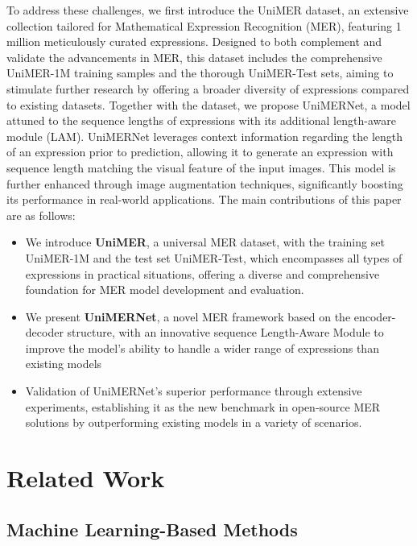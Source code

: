 \documentclass[runningheads]{llncs}
\begin{document}
To address these challenges, we first introduce the UniMER dataset, an extensive collection tailored for Mathematical Expression Recognition (MER), featuring 1 million meticulously curated expressions. Designed to both complement and validate the advancements in MER, this dataset includes the comprehensive UniMER-1M training samples and the thorough UniMER-Test sets, aiming to stimulate further research by offering a broader diversity of expressions compared to existing datasets.
Together with the dataset, we propose UniMERNet, a model attuned to the sequence lengths of expressions with its additional length-aware module (LAM). UniMERNet leverages context information regarding the length of an expression prior to prediction, allowing it to generate an expression with sequence length matching the visual feature of the input images. This model is further enhanced through image augmentation techniques, significantly boosting its performance in real-world applications. The main contributions of this paper are as follows:
\begin{itemize}
\item We introduce \textbf{UniMER}, a universal MER dataset, with the training set UniMER-1M and the test set UniMER-Test, which encompasses all types of expressions in practical situations, offering a diverse and comprehensive foundation for MER model development and evaluation.
\item We present \textbf{UniMERNet}, a novel MER framework based on the encoder-decoder structure, with an innovative sequence Length-Aware Module to improve the model's ability to handle a wider range of expressions than existing models
\item Validation of UniMERNet's superior performance through extensive experiments, establishing it as the new benchmark in open-source MER solutions by outperforming existing models in a variety of scenarios.

\end{itemize}



\section{Related Work}
\subsection{Machine Learning-Based Methods}
\end{document}
